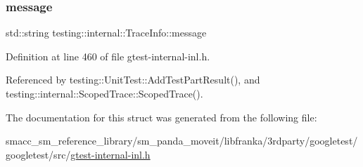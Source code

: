\mbox{\label{structtesting_1_1internal_1_1TraceInfo_a39e74f39ce6d5fdbac799abdb1c27f90}} 
\subsubsection{\texorpdfstring{message}{message}}
{\footnotesize\ttfamily std\+::string testing\+::internal\+::\+Trace\+Info\+::message}



Definition at line 460 of file gtest-\/internal-\/inl.\+h.



Referenced by testing\+::\+Unit\+Test\+::\+Add\+Test\+Part\+Result(), and testing\+::internal\+::\+Scoped\+Trace\+::\+Scoped\+Trace().



The documentation for this struct was generated from the following file\+:\begin{DoxyCompactItemize}
\item 
smacc\+\_\+sm\+\_\+reference\+\_\+library/sm\+\_\+panda\+\_\+moveit/libfranka/3rdparty/googletest/googletest/src/\hyperlink{gtest-internal-inl_8h}{gtest-\/internal-\/inl.\+h}\end{DoxyCompactItemize}
